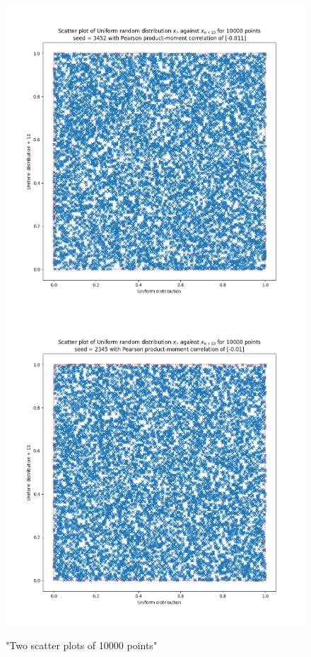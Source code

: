 \documentclass[12pt, A4]{article}
\begin{document}
\begin{figure}[h]
  \centering
    \includegraphics[scale=0.35]{Task_1_Scatter}
    \includegraphics[scale=0.35]{Task_1_Scatter1}
    \caption{"Two scatter plots of 10000 points"}\label{fig1}
\end{figure}
\end{document}
